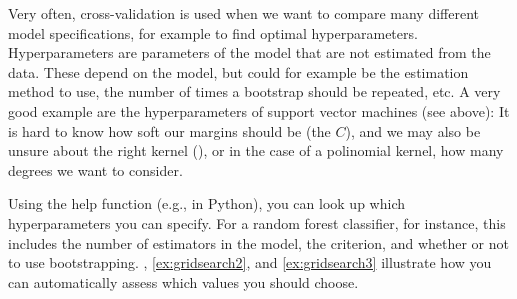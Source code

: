 
Very often, cross-validation is used when we want to compare many
different model specifications, for example to find optimal
hyperparameters.
Hyperparameters are parameters of the model that are not estimated
from the data. These depend on the model, but could for example be the
estimation method to use, the number of times a bootstrap should be
repeated, etc. A very good example are the hyperparameters of support
vector machines (see above): It is hard to know how soft our margins
should be (the $C$), and we may also be unsure about the right kernel
(), or in the case of a polinomial kernel, how many
degrees we want to consider.

Using the help function (e.g.,  in Python),
you can look up
which hyperparameters you can specify. For a random forest classifier,
for instance, this includes the number of estimators in the model, the
criterion, and whether or not to use
bootstrapping. , \ref{ex:gridsearch2}, and
\ref{ex:gridsearch3} illustrate how you can automatically assess which
values you should choose.




